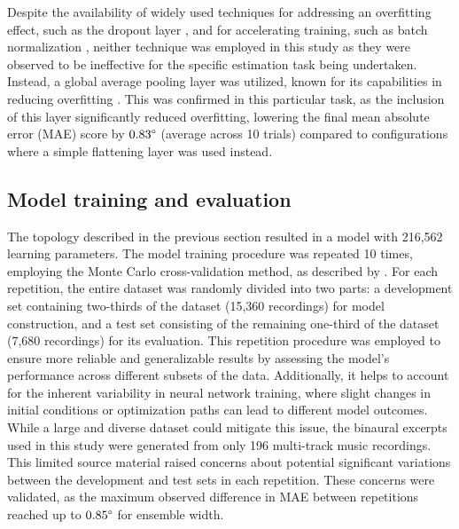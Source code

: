 \documentclass[11pt]{article}
\begin{document}
Despite the availability of widely used techniques for addressing  an overfitting effect, such as the dropout layer \parencite{srivastava_dropout_2014}, and for accelerating training, such as batch normalization \parencite{ioffe_batch_2015}, neither technique was employed in this study as they were observed to be ineffective for the specific estimation task being undertaken. Instead, a global average pooling layer was utilized, known for its capabilities in reducing overfitting \parencite{lin_network_2013}. This was confirmed in this particular task, as the inclusion of this layer significantly reduced overfitting, lowering the final mean absolute error (MAE) score by $0.83\degree$ (average across 10 trials) compared to configurations where a simple flattening layer was used instead.

\subsection{Model training and evaluation}
\label{subsec:training_evaluation}

The topology described in the previous section resulted in a model with 216,562 learning parameters. The model training procedure was repeated 10 times, employing the Monte Carlo cross-validation method, as described by \textcite{kuhn_applied_2013}. For each repetition, the entire dataset was randomly divided into two parts: a development set containing two-thirds of the dataset (15,360 recordings) for model construction, and a test set consisting of the remaining one-third of the dataset (7,680 recordings) for its evaluation. This repetition procedure was employed to ensure more reliable and generalizable results by assessing the model's performance across different subsets of the data. Additionally, it helps to account for the inherent variability in neural network training, where slight changes in initial conditions or optimization paths can lead to different model outcomes. While a large and diverse dataset could mitigate this issue, the binaural excerpts used in this study were generated from only 196 multi-track music recordings. This limited source material raised concerns about potential significant variations between the development and test sets in each repetition. These concerns were validated, as the maximum observed difference in MAE between repetitions reached up to $0.85\degree$ for ensemble width.
\end{document}
